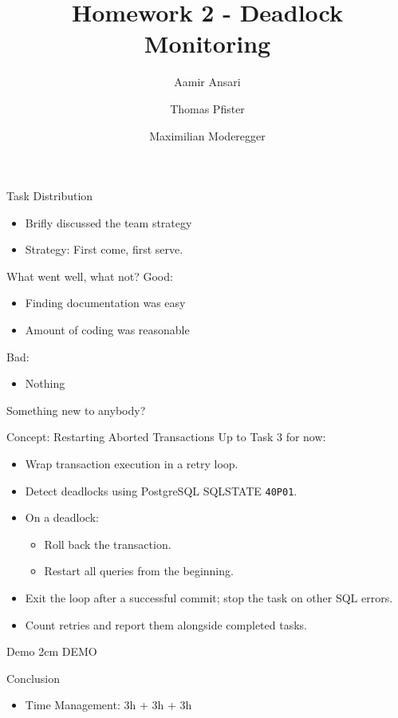 \documentclass[aspectratio=169]{beamer}
\author{
    Aamir Ansari \and Thomas Pfister \and Maximilian Moderegger
}
\title[Homework 2]{Homework 2 - Deadlock Monitoring}
\begin{document}
\maketitle

\begin{frame}[fragile]{Task Distribution}
\begin{itemize}
  \item Brifly discussed the team strategy
  \item Strategy: First come, first serve.
\end{itemize}
\end{frame}

\begin{frame}[fragile]{What went well, what not?}
Good:
  \begin{itemize}
    \item Finding documentation was easy
    \item Amount of coding was reasonable
  \end{itemize}
Bad:
\begin{itemize}
  \item Nothing
\end{itemize}
\end{frame}

\begin{frame}[fragile]{Something new to anybody?}
\end{frame}

\begin{frame}{Concept: Restarting Aborted Transactions}
  Up to Task 3 for now:
\begin{itemize}
  \item Wrap transaction execution in a retry loop.
  \item Detect deadlocks using PostgreSQL SQLSTATE \texttt{40P01}.
  \item On a deadlock:
    \begin{itemize}
      \item Roll back the transaction.
      \item Restart all queries from the beginning.
    \end{itemize}
  \item Exit the loop after a successful commit;
        stop the task on other SQL errors.
  \item Count retries and report them alongside completed tasks.
\end{itemize}
\end{frame}

\begin{frame}[fragile]{Demo}
\vbox{2cm}
\centering
DEMO
\end{frame}

\begin{frame}[fragile]{Conclusion}
\begin{itemize}
  \item Time Management: 3h + 3h + 3h %
\end{itemize}
\end{frame}
\end{document}
